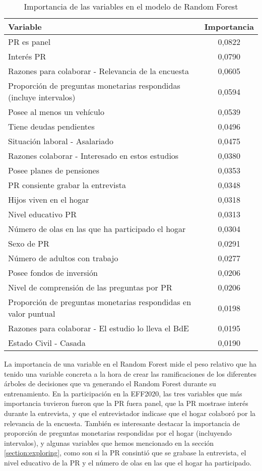 \begin{table}[ht]
    \centering
    \begin{tabular}{lc}
    \hline
        \textbf{Variable} & \textbf{Importancia} \\ \hline
        PR es panel & 0,0822 \\ 
        Interés PR & 0,0790 \\ 
        Razones para colaborar - Relevancia de la encuesta & 0,0605 \\ 
        Proporción de preguntas monetarias respondidas (incluye intervalos) & 0,0594 \\ 
        Posee al menos un vehículo & 0,0539 \\ 
        Tiene deudas pendientes & 0,0496 \\ 
        Situación laboral - Asalariado & 0,0475 \\ 
        Razones colaborar - Interesado en estos estudios & 0,0380 \\ 
        Posee planes de pensiones & 0,0353 \\ 
        PR consiente grabar la entrevista & 0,0348 \\ 
        Hijos viven en el hogar & 0,0318 \\ 
        Nivel educativo PR & 0,0313 \\ 
        Número de olas en las que ha participado el hogar & 0,0304 \\ 
        Sexo de PR & 0,0291 \\ 
        Número de adultos con trabajo & 0,0277 \\ 
        Posee fondos de inversión & 0,0206 \\ 
        Nivel de comprensión de las preguntas por PR & 0,0206 \\ 
        Proporción de preguntas monetarias respondidas en valor puntual & 0,0198 \\ 
        Razones para colaborar - El estudio lo lleva el BdE & 0,0195 \\ 
        Estado Civil - Casada & 0,0190 \\ \hline
    \end{tabular}
    \caption{Importancia de las variables en el modelo de Random Forest}
    \label{table:importance}
\end{table}

La importancia de una variable en el Random Forest mide el peso relativo que ha tenido una variable concreta a la hora de crear las ramificaciones de los diferentes árboles de decisiones que va generando el Random Forest durante su entrenamiento. En la participación en la EFF2020, las tres variables que más importancia tuvieron fueron que la PR fuera panel, que la PR mostrase interés durante la entrevista, y que el entrevistador indicase que el hogar colaboró por la relevancia de la encuesta. También es interesante destacar la importancia de proporción de preguntas monetarias respondidas por el hogar (incluyendo intervalos), y algunas variables que hemos mencionado en la sección \ref{section:exploring}, como son si la PR consintió que se grabase la entrevista, el nivel educativo de la PR y el número de olas en las que el hogar ha participado.
